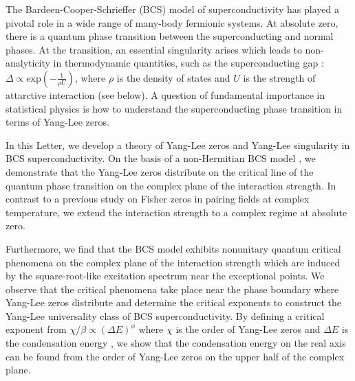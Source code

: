 \documentclass[aps,prl,twocolumn,nofootinbib,superscriptaddress,notitlepage,longbibliography]{revtex4-1}
\begin{document}
	The Bardeen-Cooper-Schrieffer (BCS) model of superconductivity \cite{Bardeen:1957tx} has played a pivotal role in a wide range of many-body fermionic systems. %
	At absolute zero, there is a quantum phase transition between the superconducting and normal phases. At the transition, an essential singularity arises which leads to non-analyticity in thermodynamic quantities, such as the superconducting gap \cite{Bardeen:1957tx}: $\Delta\propto\text{exp}(-\frac{1}{\rho U})$, where $\rho$ is the density of states and $U$ is the strength of attarctive interaction (see below). A question of fundamental importance in statistical physics is how to understand the superconducting phase transition in terms of Yang-Lee zeros.
	
	In this Letter, we develop a theory of Yang-Lee zeros and Yang-Lee singularity
	in BCS superconductivity. On the basis of a non-Hermitian BCS model \cite{Yamamoto2019}, we demonstrate
	that the Yang-Lee zeros distribute on the critical line of the quantum phase transition on the complex plane of the interaction strength. %
	In contrast to a previous study \cite{Sumaryada:2007uu} on Fisher zeros in pairing fields at complex temperature, we extend the interaction strength to a complex regime at absolute zero.
	
	Furthermore, we find that the BCS model exhibits nonunitary quantum critical phenomena on the complex plane of the interaction strength which are induced by the square-root-like excitation spectrum near the exceptional points. We observe that the critical phenomena take place near the phase boundary where Yang-Lee zeros distribute and determine the critical exponents to construct the Yang-Lee universality class of BCS superconductivity. By defining a critical exponent from $\chi/\beta\propto(\Delta E)^{\phi}$ where $\chi$ is the order of Yang-Lee zeros and $\Delta E$ is the condensation energy \cite{Coleman:2015vz}, we show that the condensation energy on the real axis can be found from the order of Yang-Lee zeros on the upper half of the complex plane. 
	 
\end{document}
